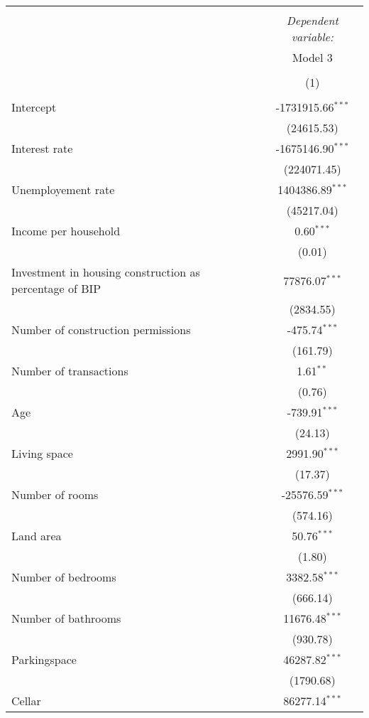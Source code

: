 \begin{table}[!htbp] \centering
\begin{tabular}{@{\extracolsep{5pt}}lc}
\\[-1.8ex]\hline
\hline \\[-1.8ex]
& \multicolumn{1}{c}{\textit{Dependent variable:}} \
\cr \cline{1-2}
\\[-1.8ex] & \multicolumn{1}{c}{Model 3} \\\\[-1.8ex] & (1) \\
\hline \\[-1.8ex]
 Intercept & -1731915.66$^{***}$ \\
  & (24615.53) \\
 Interest rate & -1675146.90$^{***}$ \\
  & (224071.45) \\
 Unemployement rate & 1404386.89$^{***}$ \\
  & (45217.04) \\
 Income per household & 0.60$^{***}$ \\
  & (0.01) \\
 Investment in housing construction as percentage of BIP & 77876.07$^{***}$ \\
  & (2834.55) \\
 Number of construction permissions & -475.74$^{***}$ \\
  & (161.79) \\
 Number of transactions & 1.61$^{**}$ \\
  & (0.76) \\
 Age & -739.91$^{***}$ \\
  & (24.13) \\
 Living space & 2991.90$^{***}$ \\
  & (17.37) \\
 Number of rooms & -25576.59$^{***}$ \\
  & (574.16) \\
 Land area & 50.76$^{***}$ \\
  & (1.80) \\
 Number of bedrooms & 3382.58$^{***}$ \\
  & (666.14) \\
 Number of bathrooms & 11676.48$^{***}$ \\
  & (930.78) \\
 Parkingspace & 46287.82$^{***}$ \\
  & (1790.68) \\
 Cellar & 86277.14$^{***}$ \\

\end{tabular}
\end{table}
